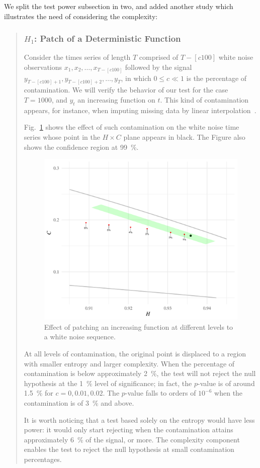 \documentclass[alpha-refs]{wiley-article}
\begin{document}
We split the test power subsection in two, and added another study which illustrates the need of considering the complexity:
\begin{quote}
	\subsubsection{$H_1$: Patch of a Deterministic Function}
	
Consider the times series of length $T$ comprised of $T-[c100]$ white noise observations $x_1,x_2,\dots, x_{T-[c100]}$ followed by the signal $y_{T-[c100]+1}, y_{T-[c100]+2}, \dots, y_T$, in which $0\leq c \ll 1$ is the percentage of contamination.
We will verify the behavior of our test for the case $T=1000$, and $y_t$ an increasing function on $t$.
This kind of contamination appears, for instance, when imputing missing data by linear interpolation~\citep{ImputationforConsecutiveMissingValuesinNonStationaryTimeSeriesData}.

Fig.~\ref{Fig:PointsPatchedIncreasingFunction} shows the effect of such contamination on the white noise time series whose point in the $H\times C$ plane appears in black.
The Figure also shows the confidence region at \SI{99}{\percent}.
	
	\begin{figure}[hbt]
		\centering
		\includegraphics[width=.7\linewidth]{Figures/PointsPatchedIncreasingFunction}
		\caption{Effect of patching an increasing function at different levels to a white noise sequence.}\label{Fig:PointsPatchedIncreasingFunction}
	\end{figure}
	
At all levels of contamination, the original point is displaced to a region with smaller entropy and larger complexity.
When the percentage of contamination is below approximately \SI{2}{\percent}, the test will not reject the null hypothesis at the \SI{1}{\percent} level of significance; in fact, the $p$-value is of around \SI{1.5}{\percent} for $c=0,0.01,0.02$.
The $p$-value falls to orders of $10^{-6}$ when the contamination is of \SI{3}{\percent} and above.

It is worth noticing that a test based solely on the entropy would have less power: it would only start rejecting when the contamination attains approximately \SI{6}{\percent} of the signal, or more.
The complexity component enables the test to reject the null hypothesis at small contamination percentages.
\end{quote}
\end{document}
